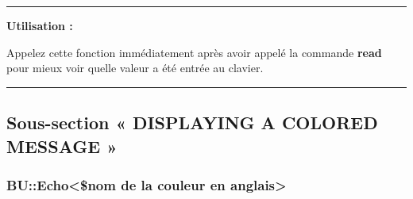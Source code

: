 \documentclass[a4paper,10pt]{article}
\begin{document}

\par\noindent\rule{\textwidth}{0.4pt}

\begin{justify}
    \textbf{Utilisation :}

    Appelez cette fonction immédiatement après avoir appelé la commande \textbf{\color{gray}read} pour mieux voir quelle valeur a été entrée au clavier.
\end{justify}




\color{sec2}\par\noindent\rule{\textwidth}{0.4pt}\color{text}\setlength{\parskip}{1em}

\color{sec2}
\subsection{Sous-section « DISPLAYING A COLORED MESSAGE »}\color{text}

\color{sec3}
\subsubsection{BU::Echo<\$nom de la couleur en anglais>}\color{text}
\end{document}
